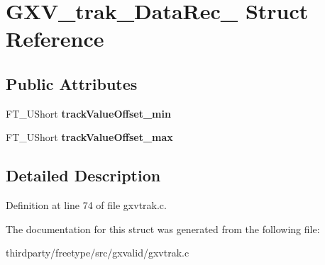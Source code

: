 \hypertarget{struct_g_x_v__trak___data_rec__}{}\section{G\+X\+V\+\_\+trak\+\_\+\+Data\+Rec\+\_\+ Struct Reference}
\label{struct_g_x_v__trak___data_rec__}
\subsection*{Public Attributes}
\begin{DoxyCompactItemize}
\item 
\mbox{\label{struct_g_x_v__trak___data_rec___a58f30cf85f19355bebf87bb7a49147e7}} 
F\+T\+\_\+\+U\+Short {\bfseries track\+Value\+Offset\+\_\+min}
\item 
\mbox{\label{struct_g_x_v__trak___data_rec___aa6e4b0a2d55703e6dc2a916a3d36f04e}} 
F\+T\+\_\+\+U\+Short {\bfseries track\+Value\+Offset\+\_\+max}
\end{DoxyCompactItemize}


\subsection{Detailed Description}


Definition at line 74 of file gxvtrak.\+c.



The documentation for this struct was generated from the following file\+:\begin{DoxyCompactItemize}
\item 
thirdparty/freetype/src/gxvalid/gxvtrak.\+c\end{DoxyCompactItemize}
